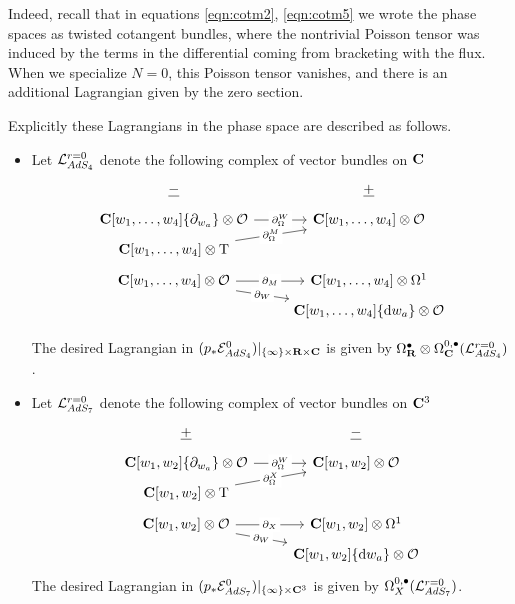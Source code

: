\documentclass[../main.tex]{subfiles}
\begin{document}
Indeed, recall that in equations \eqref{eqn:cotm2}, \eqref{eqn:cotm5} we wrote the phase spaces as twisted cotangent bundles, where the nontrivial Poisson tensor was induced by the terms in the differential coming from bracketing with the flux. When we specialize $N=0$, this Poisson tensor vanishes, and there is an additional Lagrangian given by the zero section. 

Explicitly these Lagrangians in the phase space are described as follows.
\begin{itemize}
\item Let $\mathcal{L}_{AdS_4}^{r=0}$ denote the following complex of vector bundles on $\mathbf{C}$ 
 \begin{equation}
 \begin{tikzcd}[row sep = 1 ex]
   \ul{-} & \ul{+} \\
\C[w_1,\ldots, w_4] \{\partial_{w_a}\} \otimes \mc{O}\ar[r, "\del^W_\Omega" description] &\C[w_1,\ldots, w_4]  \otimes \mc O \\
\C[w_1,\ldots, w_4]   \otimes \T\ar[ur, "\del^M_\Omega" description] \\
\C[w_1,\ldots, w_4] \otimes \mc{O}\ar[r, "\del_M" description]\ar[dr, "\del_W" description] & \C[w_1,\ldots, w_4]\otimes \Omega^1 \\ & \C[w_1,\ldots, w_4] \{\d w_a\}  \otimes \mc O
\end{tikzcd}
\end{equation}

The desired Lagrangian in $(p_*\mathcal{E}^{0}_{AdS_4})|_{\{\infty\} \times\mathbf{R}\times\mathbf{C}}$ is given by $\Omega^\bullet_{\mathbf{R}}\otimes \Omega^{0,\bullet}_{\mathbf{C}} (\mathcal{L}_{AdS_4}^{r=0})$.


\item Let $\mathcal{L}_{AdS_7}^{r=0}$ denote the following complex of vector bundles on $\mathbf{C}^3$
 \begin{equation}
 \begin{tikzcd}[row sep = 1 ex]
   \ul{+} & \ul{-} \\
\C[w_1, w_2] \{\partial_{w_a}\} \otimes \mc{O}\ar[r, "\del^W_\Omega" description] &\C[w_1,w_2]  \otimes \mc O \\
\C[w_1, w_2]   \otimes \T\ar[ur, "\del^X_\Omega" description] \\
\C[w_1, w_2] \otimes \mc{O}\ar[r, "\del_X" description]\ar[dr, "\del_W" description] & \C[w_1,w_2]\otimes \Omega^1 \\ & \C[w_1, w_2] \{\d w_a\}  \otimes \mc O
\end{tikzcd}
\end{equation}
The desired Lagrangian in $(p_*\mathcal{E}^{0}_{AdS_7})|_{\{\infty\} \times\mathbf{C}^3}$ is given by $\Omega^{0,\bullet}_{X} (\mathcal{L}_{AdS_7}^{r=0})$.
\end{itemize}
\end{document}
